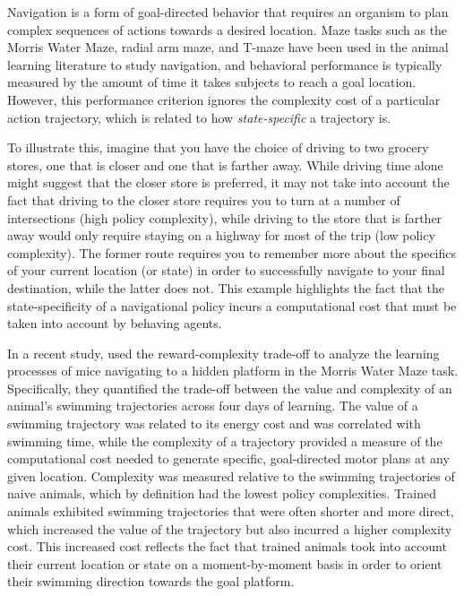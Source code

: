 \documentclass[11pt]{article}
\begin{document}
Navigation is a form of goal-directed behavior that requires an organism to plan complex sequences of actions towards a desired location. Maze tasks such as the Morris Water Maze, radial arm maze, and T-maze have been used in the animal learning literature to study navigation, and behavioral performance is typically measured by the amount of time it takes subjects to reach a goal location. However, this performance criterion ignores the complexity cost of a particular action trajectory, which is related to how \textit{state-specific} a trajectory is.

To illustrate this, imagine that you have the choice of driving to two grocery stores, one that is closer and one that is farther away. While driving time alone might suggest that the closer store is preferred, it may not take into account the fact that driving to the closer store requires you to turn at a number of intersections (high policy complexity), while driving to the store that is farther away would only require staying on a highway for most of the trip (low policy complexity). The former route requires you to remember more about the specifics of your current location (or state) in order to successfully navigate to your final destination, while the latter does not. This example highlights the fact that the state-specificity of a navigational policy incurs a computational cost that must be taken into account by behaving agents.

In a recent study, \cite{Amir2020-lm} used the reward-complexity trade-off to analyze the learning processes of mice navigating to a hidden platform in the Morris Water Maze task. Specifically, they quantified the trade-off between the value and complexity of an animal's swimming trajectories across four days of learning. The value of a swimming trajectory was related to its energy cost and was correlated with swimming time, while the complexity of a trajectory provided a measure of the computational cost needed to generate specific, goal-directed motor plans at any given location. Complexity was measured relative to the swimming trajectories of naive animals, which by definition had the lowest policy complexities. Trained animals exhibited swimming trajectories that were often shorter and more direct, which increased the value of the trajectory but also incurred a higher complexity cost. This increased cost reflects the fact that trained animals took into account their current location or state on a moment-by-moment basis in order to orient their swimming direction towards the goal platform.
\end{document}
